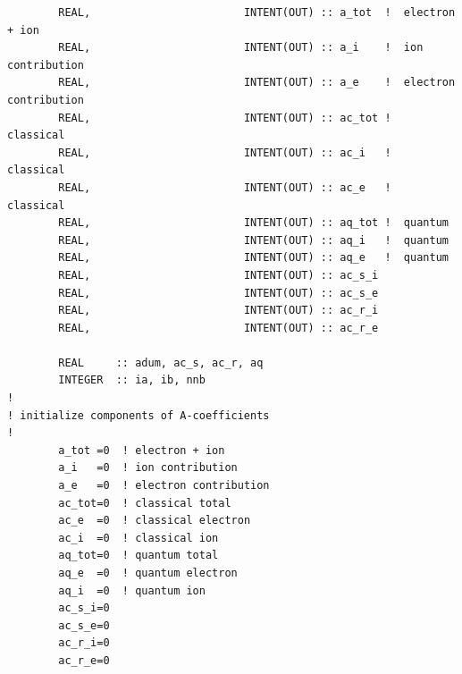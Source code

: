 \documentclass[preprint,12pt,eqsecnum,nofootinbib,amsmath,amssymb]{revtex4}
\begin{document}
{\begin{verbatim}
        REAL,                        INTENT(OUT) :: a_tot  !  electron + ion
        REAL,                        INTENT(OUT) :: a_i    !  ion contribution
        REAL,                        INTENT(OUT) :: a_e    !  electron contribution
        REAL,                        INTENT(OUT) :: ac_tot !  classical
        REAL,                        INTENT(OUT) :: ac_i   !  classical
        REAL,                        INTENT(OUT) :: ac_e   !  classical
        REAL,                        INTENT(OUT) :: aq_tot !  quantum
        REAL,                        INTENT(OUT) :: aq_i   !  quantum
        REAL,                        INTENT(OUT) :: aq_e   !  quantum
        REAL,                        INTENT(OUT) :: ac_s_i
        REAL,                        INTENT(OUT) :: ac_s_e 
        REAL,                        INTENT(OUT) :: ac_r_i
        REAL,                        INTENT(OUT) :: ac_r_e

        REAL     :: adum, ac_s, ac_r, aq
        INTEGER  :: ia, ib, nnb
!
! initialize components of A-coefficients
!
        a_tot =0  ! electron + ion
        a_i   =0  ! ion contribution
        a_e   =0  ! electron contribution
        ac_tot=0  ! classical total
        ac_e  =0  ! classical electron
        ac_i  =0  ! classical ion
        aq_tot=0  ! quantum total
        aq_e  =0  ! quantum electron
        aq_i  =0  ! quantum ion
        ac_s_i=0 
        ac_s_e=0 
        ac_r_i=0
        ac_r_e=0


\end{verbatim}}
\end{document}
